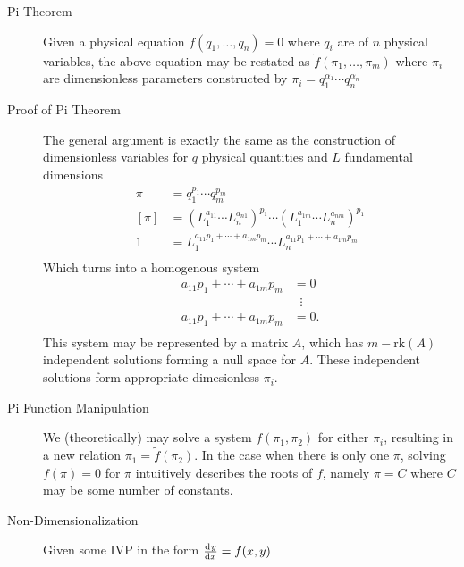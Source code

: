\documentclass[8pt]{article}
\begin{document}

\begin{multicols}{2}
  \begin{description}
  \item[Pi Theorem] Given a physical equation $f(q_1,\ldots,q_n)=0$ where $q_i$
    are of $n$ physical variables, the above equation may be restated as
    $\tilde{f}(\pi_1,\ldots,\pi_m)$ where $\pi_i$ are dimensionless parameters
    constructed by $\pi_i=q_1^{\alpha_1}\cdots q_n^{\alpha_n}$
  \item[Proof of Pi Theorem] The general argument is exactly the same as the
    construction of dimensionless variables for $q$ physical quantities and $L$
    fundamental dimensions
    \begin{equation*}
        \begin{aligned}
          \pi &= q_1^{p_1}\cdots q_m^{p_m} \\
          [\pi] &= {(L_1^{a_{11}}\cdots L_n^{a_{n1}})}^{p_1}\cdots
          {(L_1^{a_{1m}}\cdots L_n^{a_{nm}})}^{p_1} \\
          1 &= L_1^{a_{11}p_1+\cdots+a_{1m}p_m}\cdots L_n^{a_{11}p_1+\cdots+a_{1m}p_m} \\
        \end{aligned}
    \end{equation*}
    Which turns into a homogenous system
    \begin{equation*}
      \begin{aligned}
        a_{11}p_1+\cdots+a_{1m}p_m &= 0 \\
        &\;\;\vdots \\
        a_{11}p_1+\cdots+a_{1m}p_m &= 0. \\
      \end{aligned}
    \end{equation*}
    This system may be represented by a matrix $A$, which has $m-\text{rk}(A)$
    independent solutions forming a null space for $A$. These independent
    solutions form appropriate dimesionless $\pi_i$.
  \item[Pi Function Manipulation] We (theoretically) may solve a system
    $f(\pi_1, \pi_2)$ for either $\pi_i$, resulting in a new relation
    $\pi_1=\tilde{f}(\pi_2)$. In the case when there is only one $\pi$, solving
    $f(\pi)=0$ for $\pi$ intuitively describes the roots of $f$, namely $\pi=C$
    where $C$ may be some number of constants.
  \item[Non-Dimensionalization] Given some IVP in the form $\frac{\mathrm{d}^{} {y}}{\mathrm{d}{x}^{}}=f(x,y)$

\end{description}
\end{multicols}
\end{document}
